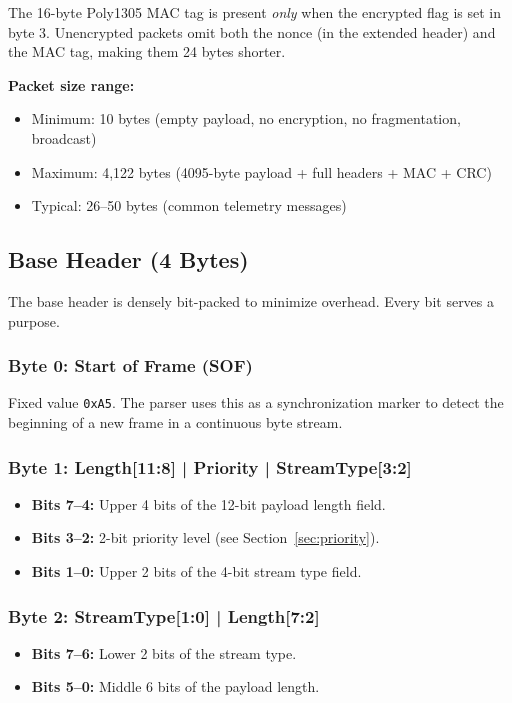 \documentclass[11pt,a4paper]{article}
\begin{document}
\begin{notebox}
The 16-byte Poly1305 MAC tag is present \emph{only} when the encrypted flag is set in byte 3. Unencrypted packets omit both the nonce (in the extended header) and the MAC tag, making them 24 bytes shorter.
\end{notebox}

\textbf{Packet size range:}
\begin{itemize}[noitemsep]
    \item Minimum: 10 bytes (empty payload, no encryption, no fragmentation, broadcast)
    \item Maximum: 4{,}122 bytes (4095-byte payload + full headers + MAC + CRC)
    \item Typical: 26--50 bytes (common telemetry messages)
\end{itemize}

\subsection{Base Header (4 Bytes)}

The base header is densely bit-packed to minimize overhead. Every bit serves a purpose.

\subsubsection{Byte 0: Start of Frame (SOF)}
Fixed value \texttt{0xA5}. The parser uses this as a synchronization marker to detect the beginning of a new frame in a continuous byte stream.

\subsubsection{Byte 1: Length[11:8] | Priority | StreamType[3:2]}
\begin{itemize}[noitemsep]
    \item \textbf{Bits 7--4:} Upper 4 bits of the 12-bit payload length field.
    \item \textbf{Bits 3--2:} 2-bit priority level (see Section~\ref{sec:priority}).
    \item \textbf{Bits 1--0:} Upper 2 bits of the 4-bit stream type field.
\end{itemize}

\subsubsection{Byte 2: StreamType[1:0] | Length[7:2]}
\begin{itemize}[noitemsep]
    \item \textbf{Bits 7--6:} Lower 2 bits of the stream type.
    \item \textbf{Bits 5--0:} Middle 6 bits of the payload length.
\end{itemize}
\end{document}
